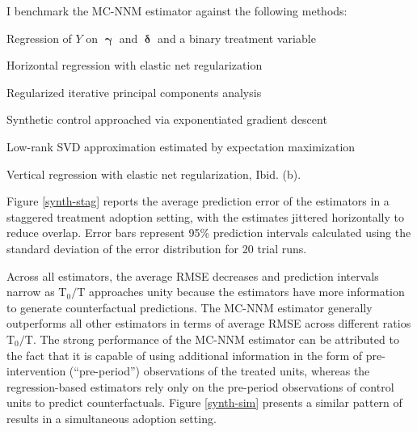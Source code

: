 I benchmark the MC-NNM estimator against the following methods:

\begin{description}
		{\setlength\itemindent{1mm}
			\item[(a) DID] Regression of $Y$ on $\boldsymbol{\upgamma}$ and $\boldsymbol{\updelta}$ and a binary treatment variable 
			\item[(b) HR-EN] Horizontal regression with elastic net regularization \citep{zou2005regularization, athey2017matrix} 
			\item[(c) PCA] Regularized iterative principal components analysis \citep{ilin2010practical}
			\item[(d) SC-ADH] Synthetic control approached via exponentiated gradient descent \citep{abadie2010synthetic}
			\item[(e) SVD] Low-rank SVD approximation estimated by expectation maximization \citep{troyanskaya2001missing}
			\item[(f) VT-EN] Vertical regression with elastic net regularization, Ibid. (b).
		}
\end{description}

Figure \ref{synth-stag} reports the average prediction error of the estimators in a staggered treatment adoption setting, with the estimates jittered horizontally to reduce overlap. Error bars represent 95\% prediction intervals calculated using the standard deviation of the error distribution for 20 trial runs. 

Across all estimators, the average RMSE decreases and prediction intervals narrow as $\text{T}_0/\text{T}$ approaches unity because the estimators have more information to generate counterfactual predictions. The MC-NNM estimator generally outperforms all other estimators in terms of average RMSE across different ratios $\text{T}_0/\text{T}$.  The strong performance of the MC-NNM estimator can be attributed to the fact that it is capable of using additional information in the form of pre-intervention (``pre-period'') observations of the treated units, whereas the regression-based estimators rely only on the pre-period observations of control units to predict counterfactuals. Figure \ref{synth-sim} presents a similar pattern of results in a simultaneous adoption setting.

